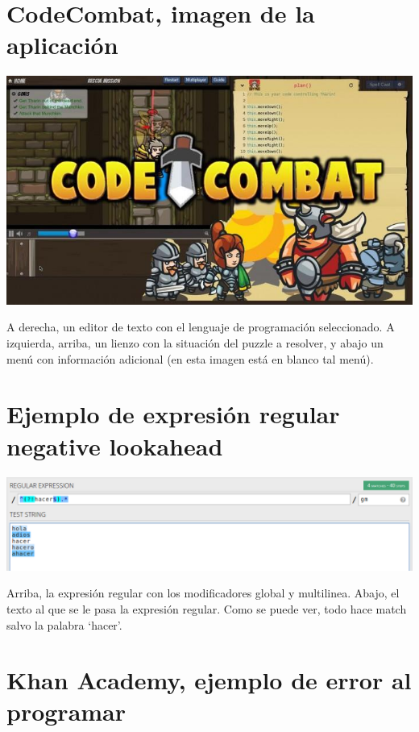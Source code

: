\documentclass{report}
\begin{document}
	
	\chapter{CodeCombat, imagen de la aplicación} \label{app:b}
	
	\begin{center}
	\includegraphics[width=1\linewidth]{codecombat}
	
	A derecha, un editor de texto con el lenguaje de programación seleccionado. A izquierda, arriba, un lienzo con la situación del puzzle a resolver, y abajo un menú con información adicional (en esta imagen está en blanco tal menú).
	\end{center}
	
	\chapter{Ejemplo de expresión regular negative lookahead} \label{app:c}
	
	\begin{center}
		\includegraphics[width=1\linewidth]{negativelookahead}
		
		Arriba, la expresión regular con los modificadores global y multilinea.
		Abajo, el texto al que se le pasa la expresión regular. Como se puede ver, todo hace match salvo la palabra `hacer'.
	\end{center}
	
	\chapter{Khan Academy, ejemplo de error al programar} \label{app:d}
	
\end{document}
